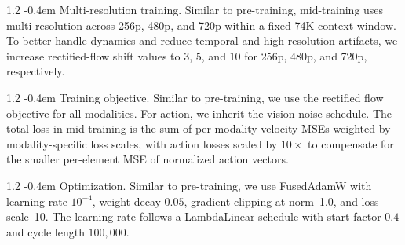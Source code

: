 \documentclass{llmxive}
\makeatletter
\providecommand{\paragraph}{  \@startsection{paragraph}{4}{\z@}    {1\baselineskip \@plus .2\baselineskip}    {-0.4em}    {\normalfont\normalsize\bfseries}}
\makeatother
\begin{document}
\begin{table}[t]
    \centering
\caption{\textbf{Generator mid-training data mixture.} After pre-training is done, we introduce new modalities (action and transfer) in the mid-training stage with the data ratios listed below.}
\label{tab:midtraining_modality_mix}
\end{table}



\paragraph{Multi-resolution training.}
Similar to pre-training, mid-training uses multi-resolution across 256p, 480p, and 720p within a fixed 74K context window. To better handle dynamics and reduce temporal and high-resolution artifacts, we increase rectified-flow shift values to $3$, $5$, and $10$ for 256p, 480p, and 720p, respectively.

\paragraph{Training objective.} Similar to pre-training, we use the rectified flow objective for all modalities. For action, we inherit the vision noise schedule. The total loss in mid-training is the sum of per-modality velocity MSEs weighted by modality-specific loss scales, with action losses scaled by $10\times$ to compensate for the smaller per-element MSE of normalized action vectors.

\paragraph{Optimization.}
Similar to pre-training, we use FusedAdamW with learning rate $10^{-4}$, weight decay $0.05$, gradient clipping at norm~1.0, and loss scale~10. The learning rate follows a LambdaLinear schedule with start factor $0.4$ and cycle length $100{,}000$.
\end{document}
